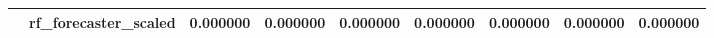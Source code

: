\begin{tabular}{llrrrrrrr}
 & rf\_forecaster\_scaled & {\cellcolor[HTML]{3B4CC0}} \color[HTML]{F1F1F1} 0.000000 & {\cellcolor[HTML]{3B4CC0}} \color[HTML]{F1F1F1} 0.000000 & {\cellcolor[HTML]{3B4CC0}} \color[HTML]{F1F1F1} 0.000000 & {\cellcolor[HTML]{3B4CC0}} \color[HTML]{F1F1F1} 0.000000 & {\cellcolor[HTML]{3B4CC0}} \color[HTML]{F1F1F1} 0.000000 & {\cellcolor[HTML]{3B4CC0}} \color[HTML]{F1F1F1} 0.000000 & {\cellcolor[HTML]{3B4CC0}} \color[HTML]{F1F1F1} 0.000000 \\
\bottomrule
\end{tabular}
